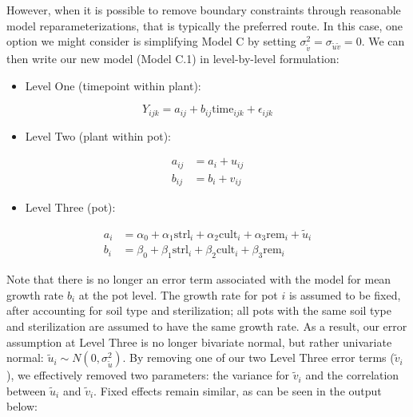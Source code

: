 \documentclass[
]{krantz}
\providecommand{\tightlist}{%
  \setlength{\itemsep}{0pt}\setlength{\parskip}{0pt}}
\begin{document}
However, when it is possible to remove boundary constraints through reasonable model reparameterizations, that is typically the preferred route. In this case, one option we might consider is simplifying Model C by setting \(\sigma_{\tilde{v}}^{2}=\sigma_{\tilde{u}\tilde{v}}=0\). We can then write our new model (Model C.1) in level-by-level formulation:

\begin{itemize}
\tightlist
\item
  Level One (timepoint within plant):
\end{itemize}

\begin{equation*}
Y_{ijk} = a_{ij}+b_{ij}\textrm{time}_{ijk}+\epsilon_{ijk}
\end{equation*}

\begin{itemize}
\tightlist
\item
  Level Two (plant within pot):
\end{itemize}

\begin{align*}
a_{ij} & = a_{i}+u_{ij} \\
b_{ij} & = b_{i}+v_{ij}
\end{align*}

\begin{itemize}
\tightlist
\item
  Level Three (pot):
\end{itemize}

\begin{align*}
a_{i} & = \alpha_{0}+\alpha_{1}\textrm{strl}_{i}+\alpha_{2}\textrm{cult}_{i}+\alpha_{3}\textrm{rem}_{i}+\tilde{u}_{i} \\
b_{i} & = \beta_{0}+\beta_{1}\textrm{strl}_{i}+\beta_{2}\textrm{cult}_{i}+\beta_{3}\textrm{rem}_{i}
\end{align*}

Note that there is no longer an error term associated with the model for mean growth rate \(b_{i}\) at the pot level. The growth rate for pot \(i\) is assumed to be fixed, after accounting for soil type and sterilization; all pots with the same soil type and sterilization are assumed to have the same growth rate. As a result, our error assumption at Level Three is no longer bivariate normal, but rather univariate normal: \(\tilde{u}_{i}\sim N(0,\sigma_{\tilde{u}}^{2})\). By removing one of our two Level Three error terms (\(\tilde{v}_{i}\)), we effectively removed two parameters: the variance for \(\tilde{v}_{i}\) and the correlation between \(\tilde{u}_{i}\) and \(\tilde{v}_{i}\). Fixed effects remain similar, as can be seen in the output below:
\end{document}
